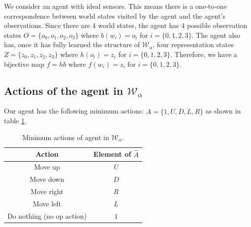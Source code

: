 We consider an agent with ideal sensors.
This means there is a one-to-one correspondence between world states visited by the agent and the agent's observations.
Since there are 4 world states, the agent has 4 possible observation states $O = \{ o_{0}, o_{1}, o_{2}, o_{3} \}$ where $b(w_{i}) = o_{i}$ for $i = \{0, 1, 2, 3 \}$.
The agent also has, once it has fully learned the structure of $\mathscr{W}_{\alpha}$, four representation states $Z = \{ z_{0}, z_{1}, z_{2}, z_{3} \}$ where $h(o_{i}) = z_{i}$ for $i = \{0, 1, 2, 3 \}$.
Therefore, we have a bijective map $f = hb$ where $f(w_{i}) = z_{i}$ for $i = \{0, 1, 2, 3 \}$.


\subsection{
Actions of the agent in $\mathscr{W}_{\alpha}$
}\label{sec:Actions of the agent in example}

Our agent has the following minimum actions: $\hat{A} = \{ 1, U, D, L, R \}$ as shown in table \ref{tab:actions_of_agent_2_by_2_cyclical}.
\begin{table}[H]
	\centering
	\begin{tabular}{|c|c|}
		\hline
		Action                    & Element of $\hat{A}$ \\
		\hline
		Move up                   & $U$                  \\
		\hline
		Move down                 & $D$                  \\
		\hline
		Move right                & $R$                  \\
		\hline
		Move left                 & $L$                  \\
		\hline
		Do nothing (no op action) & $1$                  \\
		\hline
	\end{tabular}
	\caption{Minimum actions of agent in $\mathscr{W}_{\alpha}$.}
	\label{tab:actions_of_agent_2_by_2_cyclical}
\end{table}

